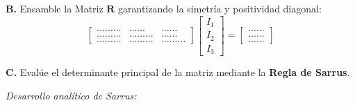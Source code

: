 \documentclass[11pt,a4paper]{article}
\begin{document}
\textbf{B.} Ensamble la Matriz $\mathbf{R}$ garantizando la simetría y positividad diagonal:
\vspace{0.1cm}
$$
\begin{bmatrix}
 \dots \dots \dots & \dots \dots & \dots \dots \\
 \dots \dots \dots & \dots \dots \dots & \dots \dots \\
 \dots \dots \dots & \dots \dots \dots & \dots \dots \dots
\end{bmatrix}
\begin{bmatrix}
 I_1 \\
 I_2 \\
 I_3
\end{bmatrix}
=
\begin{bmatrix}
 \dots \dots \\
 \dots \dots \\
 \dots \dots
\end{bmatrix}
$$
\vspace{0.1cm}

\textbf{C.} Evalúe el determinante principal de la matriz mediante la \textbf{Regla de Sarrus}.

\begin{tcolorbox}[colback=white,colframe=UCBgray,height=3cm,valign=top]
\textit{Desarrollo analítico de Sarrus:}
\end{tcolorbox}
\end{document}
